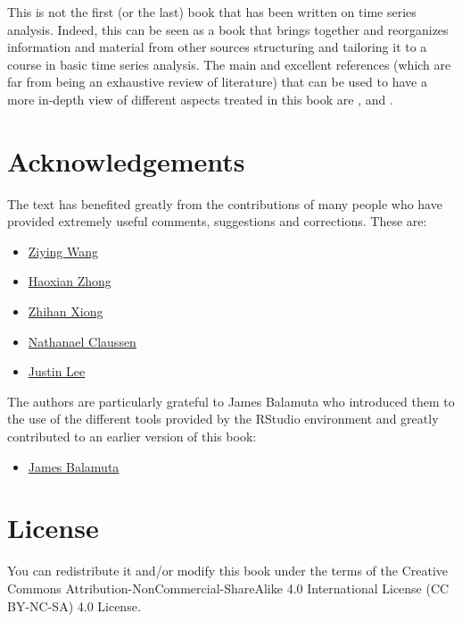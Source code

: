 \documentclass[]{book}
\providecommand{\tightlist}{%
  \setlength{\itemsep}{0pt}\setlength{\parskip}{0pt}}
\theoremstyle{definition}
\theoremstyle{definition}
\theoremstyle{definition}
\theoremstyle{remark}
\begin{document}
This is not the first (or the last) book that has been written on time
series analysis. Indeed, this can be seen as a book that brings together
and reorganizes information and material from other sources structuring
and tailoring it to a course in basic time series analysis. The main and
excellent references (which are far from being an exhaustive review of
literature) that can be used to have a more in-depth view of different
aspects treated in this book are \citet{cochrane2005time},
\citet{hamilton1994time} and \citet{shumway2010time}.

\section{Acknowledgements}\label{acknowledgements}

The text has benefited greatly from the contributions of many people who
have provided extremely useful comments, suggestions and corrections.
These are:

\begin{itemize}
\tightlist
\item
  \href{https://github.com/zionward}{Ziying Wang}
\item
  \href{https://github.com/Lyle-Haoxian}{Haoxian Zhong}
\item
  \href{https://www.linkedin.com/in/zhihan-xiong-988152114}{Zhihan
  Xiong}
\item
  \href{https://github.com/Nathanael-Claussen}{Nathanael Claussen}
\item
  \href{https:://github.com/munsheet}{Justin Lee}
\end{itemize}

The authors are particularly grateful to James Balamuta who introduced
them to the use of the different tools provided by the RStudio
environment and greatly contributed to an earlier version of this book:

\begin{itemize}
\tightlist
\item
  \href{https::/github.com/coatless}{James Balamuta}
\end{itemize}

\section{License}\label{license}

You can redistribute it and/or modify this book under the terms of the
Creative Commons Attribution-NonCommercial-ShareAlike 4.0 International
License (CC BY-NC-SA) 4.0 License.
\end{document}
